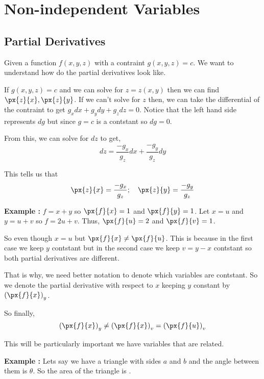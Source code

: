 

\chapter{Non-independent Variables}

\bigbreak
\section{Partial Derivatives}

Given a function $f(x, y, z)$ with a contraint $g(x, y, z) = c$.
We want to understand how do the partial derivatives look like.

If $g(x, y, z) = c$ and we can solve for $z = z(x, y)$ then we can find $\px{z}{x}, \px{z}{y}$.
If we can't solve for $z$ then, we can take the differential of the contraint to get $ g_x dx + g_y dy + g_z dz = 0 $. 
Notice that the left hand side represents $dg$ but since $g = c$ is a contstant so $dg = 0$.

From this, we can solve for $dz$ to get, $$ dz = \frac{-g_x}{g_z} dx + \frac{-g_y}{g_z} dy $$

This tells us that $$ \px{z}{x} = \frac{-g_x}{g_z} ; \quad \px{z}{y} = \frac{-g_y}{g_z} $$

{\bf Example : } $f = x + y$ so $\px{f}{x} = 1$ and $\px{f}{y} = 1$.
Let $x = u$ and $y = u + v$ so $f = 2u + v$. Thus, $\px{f}{u} = 2$ and $\px{f}{v} = 1$.

So even though $x = u$ but $\px{f}{x} \neq \px{f}{u}$. 
This is because in the first case we keep $y$ contstant but in the second case we keep $v = y - x$ contstant
so both partial derivatives are different.

That is why, we need better notation to denote which variables are contstant. 
So we denote the partial derivative with respect to $x$ keeping $y$ constant by $\left( \px{f}{x} \right)_y$.

So finally, 
$$ \left( \px{f}{x} \right)_y \neq \left( \px{f}{x} \right)_v = \left( \px{f}{u} \right)_v $$

This will be particularly important we have variables that are related.


{\bf Example : }
Lets say we have a triangle with sides $a$ and $b$ and the angle between them is $\theta$.
So the area of the triangle is .

